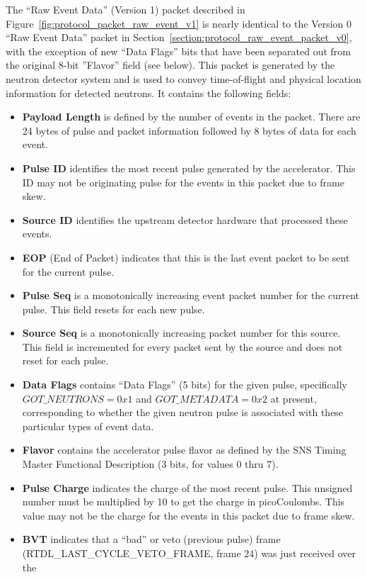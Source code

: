 The ``Raw Event Data'' (Version 1) packet described in
Figure~\ref{fig:protocol_packet_raw_event_v1} is nearly identical to
the Version 0 ``Raw Event Data'' packet
in Section~\ref{section:protocol_raw_event_packet_v0},
with the exception of new ``Data Flags'' bits
that have been separated out from the original 8-bit ''Flavor'' field
(see below).
This packet is generated by the neutron
detector system and is used to convey time-of-flight and physical location
information for detected neutrons. It contains the following fields:
\begin{itemize}
\item{\bf Payload Length} is defined by the number of events in the packet.
There are 24 bytes of pulse and packet information followed by 8 bytes of
data for each event.
\item{\bf Pulse ID} identifies the most recent pulse generated by the
accelerator. This ID may not be originating pulse for the events
in this packet due to frame skew.
\item{\bf Source ID} identifies the upstream detector hardware that
processed these events.
\item{\bf EOP} (End of Packet) indicates that this is the last event packet
to be sent for the current pulse.
\item{\bf Pulse Seq} is a monotonically increasing event packet number
for the current pulse.
This field resets for each new pulse.
\item{\bf Source Seq} is a monotonically increasing packet number
for this source.
This field is incremented for every packet sent by the source and does not
reset for each pulse.
\item{\bf Data Flags} contains ``Data Flags'' (5 bits) for the given pulse,
specifically $ GOT\_NEUTRONS = 0x1 $ and $ GOT\_METADATA = 0x2 $
at present,
corresponding to whether the given neutron pulse is associated with
these particular types of event data.
\item{\bf Flavor} contains the accelerator pulse flavor as defined by
the SNS Timing Master Functional Description
(3 bits, for values 0 thru 7).
\item{\bf Pulse Charge} indicates the charge of the most recent pulse. This
unsigned number must be multiplied by 10 to get the charge in picoCoulombs. This
value may not be the charge for the events in this packet due to frame skew.
\item{\bf BVT} indicates that a ``bad'' or veto (previous pulse) frame
(RTDL\_LAST\_CYCLE\_VETO\_FRAME, frame 24) was just received over the

\end{itemize}
